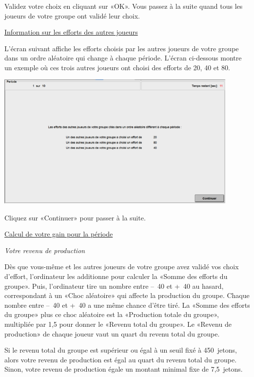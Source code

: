 \begin{Article}
\begin{refsection}[Lebourges]
\begin{appendices}
Validez votre choix en cliquant sur «OK». Vous passez à la suite quand
tous les joueurs de votre groupe ont validé leur choix.
\vspace{0,2cm}

\ul{Information sur les efforts des autres joueurs}

\vspace{0,2cm}
L'écran suivant affiche les efforts choisis par les autres joueurs de
votre groupe dans un ordre aléatoire qui change à chaque période.
L'écran ci-dessous montre un exemple où ces trois autres joueurs ont
choisi des efforts de 20, 40 et 80.

\vspace{0,2cm}

\includegraphics[width = 0.9\textwidth]{05_fig10-annexII.png}

Cliquez sur «Continuer» pour passer à la suite.
\vspace{0,2cm}

\ul{Calcul de votre gain pour la période}

\vspace{0,2cm}
\emph{Votre revenu de production}

\vspace{0,2cm}
Dès que vous-même et les autres joueurs de votre groupe avez validé vos
choix d'effort, l'ordinateur les additionne pour calculer la «Somme des
efforts du groupe». Puis, l'ordinateur tire un nombre entre --~40 et
+~40 au hasard, correspondant à un «Choc aléatoire» qui affecte la
production du groupe. Chaque nombre entre --~40 et +~40 a une même
chance d'être tiré. La «Somme des efforts du groupe» plus ce choc
aléatoire est la «Production totale du groupe», multipliée par 1,5
pour donner le «Revenu total du groupe». Le «Revenu de production»
de chaque joueur vaut un quart du revenu total du groupe.

Si le revenu total du groupe est supérieur ou égal à un seuil fixé à
450~jetons, alors votre revenu de production est égal au quart du revenu
total du groupe. Sinon, votre revenu de production égale un montant
minimal fixe de 7,5~jetons.


\end{appendices}
\end{refsection}
\end{Article}
